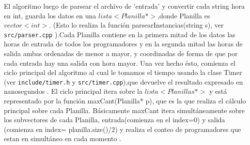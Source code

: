 El algoritmo luego de parsear el archivo de 'entrada' y convertir cada string hora en  int, guarda los datos  en una \emph{$lista< Planilla*>$},donde Planilla es \emph{$vector<int>$}. (Esto lo realiza la función parsearInstancias(string s), ver \texttt{src/parser.cpp} ).Cada Planilla contiene en la primera mitad de los datos las horas de entrada de todos los programadores y en la segunda mitad las horas de salida ambas ordenadas de menor a mayor, y coordinadas de forma de que por cada entrada hay una salida con hora mayor.
\newline
Una vez hecho ésto, comienza el ciclo principal del algoritmo al cual le tomamos el tiempo usando la clase Timer (ver \texttt{include/timer.h} y \texttt{src/timer.cpp}),que devuelve el resultado expresado en nanosegundos .
\newline
El ciclo principal  itera sobre la \emph{$lista<Planillas*>$}  y  está representado por la función maxCant(Planilla* p), que es la que realiza el cálculo principal sobre cada Planilla.
\newline
Básicamente maxCant itera simultáneamente sobre los subvectores de cada Planilla, entrada(comienza en el index=0) y salida (comienza en index= planilla.size()/2) y realiza el conteo de programadores que estan en simultáneo en cada momento .

